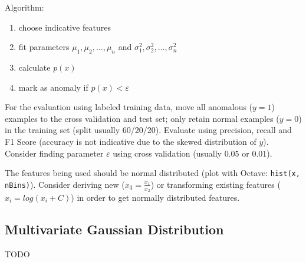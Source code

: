 \documentclass[a4paper,11pt]{scrartcl}
\begin{document}
Algorithm:

\begin{enumerate}
    \item choose indicative features
    \item fit parameters $\mu_1,\mu_2,\dots,\mu_n$ and  $\sigma_1^2,\sigma_2^2,\dots,\sigma_n^2$
    \item calculate $p(x)$
    \item mark as anomaly if $p(x) <  \varepsilon$
\end{enumerate}

For the evaluation using labeled training data, move all anomalous ($y=1$) examples to the cross validation and test set; only retain normal examples ($y=0$) in the training set (split usually 60/20/20). Evaluate using precision, recall and F1 Score (accuracy is not indicative due to the skewed distribution of $y$). Consider finding parameter $\varepsilon$ using cross validation (usually $0.05$ or $0.01$).

The features being used should be normal distributed (plot with Octave: \texttt{hist(x, nBins)}). Consider deriving new ($x_3 = \frac{x_1}{x_2}$) or transforming existing features ($x_i = log(x_i + C)$) in order to get normally distributed features.

\subsection{Multivariate Gaussian Distribution}

TODO
\end{document}
